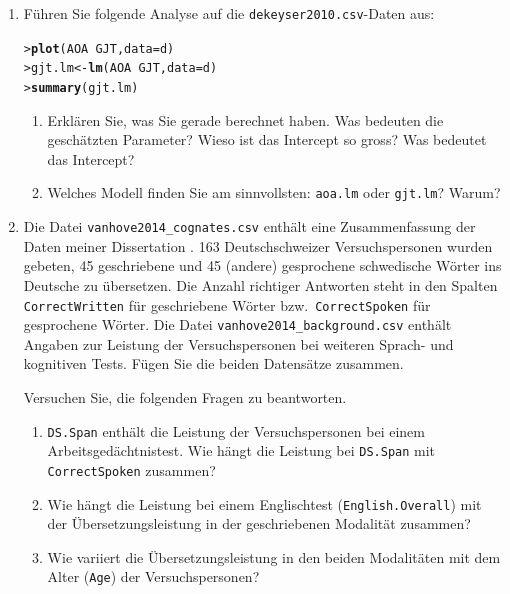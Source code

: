 \documentclass[oneside, 10pt]{book}\usepackage[]{graphicx}\usepackage[]{xcolor}
\makeatletter
\newcommand{\hlopt}[1]{\textcolor[rgb]{0,0,0}{#1}}%
\newcommand{\hlstd}[1]{\textcolor[rgb]{0.345,0.345,0.345}{#1}}%
\newcommand{\hlkwb}[1]{\textcolor[rgb]{0.69,0.353,0.396}{#1}}%
\newcommand{\hlkwc}[1]{\textcolor[rgb]{0.333,0.667,0.333}{#1}}%
\newcommand{\hlkwd}[1]{\textcolor[rgb]{0.737,0.353,0.396}{\textbf{#1}}}%
\newenvironment{kframe}{%
 \def\at@end@of@kframe{}%
 \ifinner\ifhmode%
  \def\at@end@of@kframe{\end{minipage}}%
  \begin{minipage}{\columnwidth}%
 \fi\fi%
 \def\FrameCommand##1{\hskip\@totalleftmargin \hskip-\fboxsep
 \colorbox{shadecolor}{##1}\hskip-\fboxsep
     \hskip-\linewidth \hskip-\@totalleftmargin \hskip\columnwidth}%
 \MakeFramed {\advance\hsize-\width
   \@totalleftmargin\z@ \linewidth\hsize
   \@setminipage}}%
 {\par\unskip\endMakeFramed%
 \at@end@of@kframe}
\newenvironment{knitrout}{}{} %
\makeatother
\begin{document}
\begin{enumerate}
 \item Führen Sie folgende Analyse auf die \texttt{dekeyser2010.csv}-Daten aus:
\begin{knitrout}
\color{fgcolor}\begin{kframe}
\begin{alltt}
\hlstd{> }\hlkwd{plot}\hlstd{(AOA} \hlopt{~} \hlstd{GJT,} \hlkwc{data} \hlstd{= d)}
\hlstd{> }\hlstd{gjt.lm} \hlkwb{<-} \hlkwd{lm}\hlstd{(AOA} \hlopt{~}  \hlstd{GJT,} \hlkwc{data} \hlstd{= d)}
\hlstd{> }\hlkwd{summary}\hlstd{(gjt.lm)}
\end{alltt}
\end{kframe}
\end{knitrout}
\begin{enumerate}
\item Erklären Sie, was Sie gerade berechnet haben. Was bedeuten die geschätzten Parameter? Wieso ist das Intercept so gross?
Was bedeutet das Intercept?
\item Welches Modell finden Sie am sinnvollsten: \texttt{aoa.lm} oder \texttt{gjt.lm}? Warum?
\end{enumerate}

 \item Die Datei \texttt{vanhove2014\_cognates.csv} enthält eine Zusammenfassung der Daten meiner Dissertation
 \citep{Vanhove2014}.
 163 Deutschschweizer Versuchspersonen wurden gebeten, 45 geschriebene und 45 (andere) gesprochene
 schwedische Wörter ins Deutsche zu übersetzen. Die Anzahl richtiger Antworten steht in
 den Spalten \texttt{CorrectWritten} für geschriebene Wörter bzw.\ \texttt{CorrectSpoken} für gesprochene Wörter. Die Datei \texttt{vanhove2014\_background.csv}
 enthält Angaben zur Leistung der Versuchspersonen bei weiteren Sprach- und kognitiven Tests.
 Fügen Sie die beiden Datensätze zusammen.

 Versuchen Sie, die folgenden Fragen zu beantworten.

 \begin{enumerate}
  \item \texttt{DS.Span} enthält die Leistung der Versuchspersonen
  bei einem Arbeitsgedächtnistest.
  Wie hängt die Leistung bei \texttt{DS.Span} mit \texttt{CorrectSpoken} zusammen?

 \item Wie hängt die Leistung bei einem Englischtest
 (\texttt{English.Overall}) mit der Übersetzungsleistung
 in der geschriebenen Modalität zusammen?

 \item Wie variiert die Übersetzungsleistung in den beiden
 Modalitäten mit dem Alter (\texttt{Age}) der Versuchspersonen?
\end{enumerate}
\end{enumerate}
\end{document}
